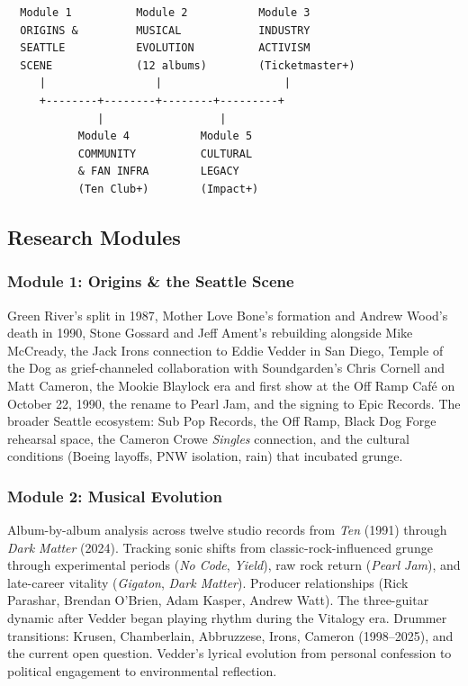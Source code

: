 \documentclass[11pt,letterpaper]{article}
\begin{document}
\begin{asciibox}
\begin{verbatim}
  Module 1          Module 2           Module 3
  ORIGINS &         MUSICAL            INDUSTRY
  SEATTLE           EVOLUTION          ACTIVISM
  SCENE             (12 albums)        (Ticketmaster+)
     |                 |                   |
     +--------+--------+--------+---------+
              |                  |
           Module 4           Module 5
           COMMUNITY          CULTURAL
           & FAN INFRA        LEGACY
           (Ten Club+)        (Impact+)
\end{verbatim}
\end{asciibox}

\subsection{Research Modules}

\subsubsection{Module 1: Origins \& the Seattle Scene}

Green River's split in 1987, Mother Love Bone's formation and Andrew Wood's death in 1990, Stone Gossard and Jeff Ament's rebuilding alongside Mike McCready, the Jack Irons connection to Eddie Vedder in San Diego, Temple of the Dog as grief-channeled collaboration with Soundgarden's Chris Cornell and Matt Cameron, the Mookie Blaylock era and first show at the Off Ramp Caf\'{e} on October 22, 1990, the rename to Pearl Jam, and the signing to Epic Records. The broader Seattle ecosystem: Sub Pop Records, the Off Ramp, Black Dog Forge rehearsal space, the Cameron Crowe \textit{Singles} connection, and the cultural conditions (Boeing layoffs, PNW isolation, rain) that incubated grunge.

\subsubsection{Module 2: Musical Evolution}

Album-by-album analysis across twelve studio records from \textit{Ten} (1991) through \textit{Dark Matter} (2024). Tracking sonic shifts from classic-rock-influenced grunge through experimental periods (\textit{No Code}, \textit{Yield}), raw rock return (\textit{Pearl Jam}), and late-career vitality (\textit{Gigaton}, \textit{Dark Matter}). Producer relationships (Rick Parashar, Brendan O'Brien, Adam Kasper, Andrew Watt). The three-guitar dynamic after Vedder began playing rhythm during the Vitalogy era. Drummer transitions: Krusen, Chamberlain, Abbruzzese, Irons, Cameron (1998--2025), and the current open question. Vedder's lyrical evolution from personal confession to political engagement to environmental reflection.
\end{document}
